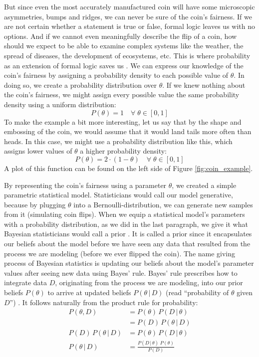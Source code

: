 \documentclass[12pt, a4paper]{report}
\begin{document}
But since even the most accurately manufactured coin will have some microscopic asymmetries, bumps and ridges, we can never be sure of the coin's fairness.
If we are not certain whether a statement is true or false, formal logic leaves us with no options.
And if we cannot even meaningfully describe the flip of a coin, how should we expect to be able to examine complex systems like the weather, the spread of diseases, the development of ecosystems, etc.
This is where probability as an extension of formal logic saves us \cite[12]{jaynes}.
We can express our knowledge of the coin's fairness by assigning a probability density to each possible value of $\theta$.
In doing so, we create a probability distribution over $\theta$.
If we knew nothing about the coin's fairness, we might assign every possible value the same probability density using a uniform distribution:
$$
    P(\theta) = 1 \quad \forall \; \theta \in [0,1]
$$
To make the example a bit more interesting, let us say that by the shape and embossing of the coin, we would assume that it would land tails more often than heads.
In this case, we might use a probability distribution like this, which assigns lower values of $\theta$ a higher probability density:
$$
    P(\theta) = 2 \cdot (1-\theta) \quad \forall \; \theta \in [0,1]
$$
A plot of this function can be found on the left side of Figure \ref{fig:coin_example}.

By representing the coin's fairness using a parameter $\theta$, we created a simple parametric statistical model.
Statisticians would call our model generative, because by plugging $\theta$ into a Bernoulli-distribution, we can generate new samples from it (simulating coin flips).
When we equip a statistical model's parameters with a probability distribution, as we did in the last paragraph, we give it what Bayesian statisticians would call a prior \cite[34]{mcelreath}.
It is called a prior since it encapsulates our beliefs about the model before we have seen any data that resulted from the process we are modeling (before we ever flipped the coin).
The name giving process of Bayesian statistics is updating our beliefs about the model's parameter values after seeing new data using Bayes' rule.
Bayes' rule prescribes how to integrate data $D$, originating from the process we are modeling, into our prior beliefs $P(\theta)$ to arrive at updated beliefs $P(\theta \, | \, D)$ (read ``probability of $\theta$ given $D$'') \cite[36]{mcelreath}.
It follows naturally from the product rule for probability:
\begin{align}
    P(\theta, D) &= P(\theta) \, P(D \,|\, \theta) \nonumber\\
    &= P(D) \, P(\theta \,|\, D) \nonumber\\
    P(D) \, P(\theta \,|\, D) &= P(\theta) \, P(D \,|\, \theta) \nonumber\\
    P(\theta \, | \, D) &= \frac{P(D \,|\, \theta) \; P(\theta)}{P(D)}
    \label{eq:bayes}
\end{align}
\end{document}
